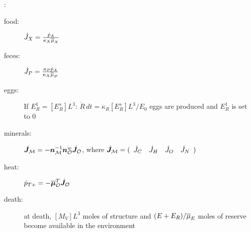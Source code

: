 \vspace{5mm}: {\small
\begin{description}
  \item[food: ] $\dot{J}_X = \frac{\dot{p}_A} {\kappa_X \overline{\mu}_X}$ 
		
  \item[feces: ] $\dot{J}_P = \frac{\kappa_P \dot{p}_A} {\kappa_X \overline{\mu}_P}$
		
  \item[eggs: ] If $E_R^1 = [E_R^s] L^3$: $\dot{R}\,dt = \kappa_R [E_R^s] L^3/ E_0$ eggs are produced and $E_R^1$ is set to $0$ 
		
  \item[minerals: ] $\dot{\bm J}_{\cal M} = - {\bm n}_{\cal M}^{-1} {\bm n}_{\cal O}^w \dot{\bm J}_{\cal O}$, where 
		$\dot{\bm J}_{\cal M} = (\begin{array}{cccc} \dot{J}_C  & \dot{J}_H & \dot{J}_O  & \dot{J}_N \end{array})$
			
	\item[heat: ] $\dot{p}_{T+} = - \overline{\bm \mu}_{\cal O}^T \dot{\bm J}_{\cal O}$
		
	\item[death: ] at death, $[M_V] L^3$ moles of structure and $(E + E_R)/ \overline{\mu}_E$ moles of reserve become available in the environment
\end{description}}

